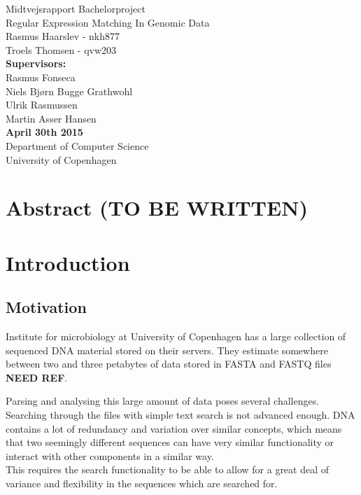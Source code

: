 \documentclass[12pt]{article}
\theoremstyle{definition}
\begin{document}
\begin{titlepage}
    \vspace*{\fill}
    \begin{center}
      {\Huge Midtvejsrapport Bachelorproject}\\[0.7cm]
      {\Large Regular Expression Matching In Genomic Data}\\[0.4cm]
      {\large Rasmus Haarslev - nkh877}\\
      {\large Troels Thomsen - qvw203}\\[0.4cm]
      {\textbf{Supervisors:}\\
      Rasmus Fonseca\\
      Niels Bjørn Bugge Grathwohl\\
      Ulrik Rasmussen\\
      Martin Asser Hansen}\\
      {\small \textbf{April 30th 2015}}\\[0.3cm] 
      {\small Department of Computer Science}\\
      {\small University of Copenhagen}
    \end{center}
    \vspace*{\fill}
\end{titlepage}	

\clearpage
{}
\thispagestyle{empty}

\newpage

\tableofcontents
\newpage


\section{Abstract (TO BE WRITTEN)}
\section{Introduction}
\subsection{Motivation}

Institute for microbiology at University of Copenhagen has a large collection of sequenced DNA material stored on their servers. They estimate somewhere between two and three petabytes of data stored in FASTA and FASTQ files \textbf{NEED REF}.

Parsing and analysing this large amount of data poses several challenges. Searching through the files with simple text search is not advanced enough. DNA contains a lot of redundancy and variation over similar concepts, which means that two seemingly different sequences can have very similar functionality or interact with other components in a similar way. \\
This requires the search functionality to be able to allow for a great deal of variance and flexibility in the sequences which are searched for.
\end{document}
